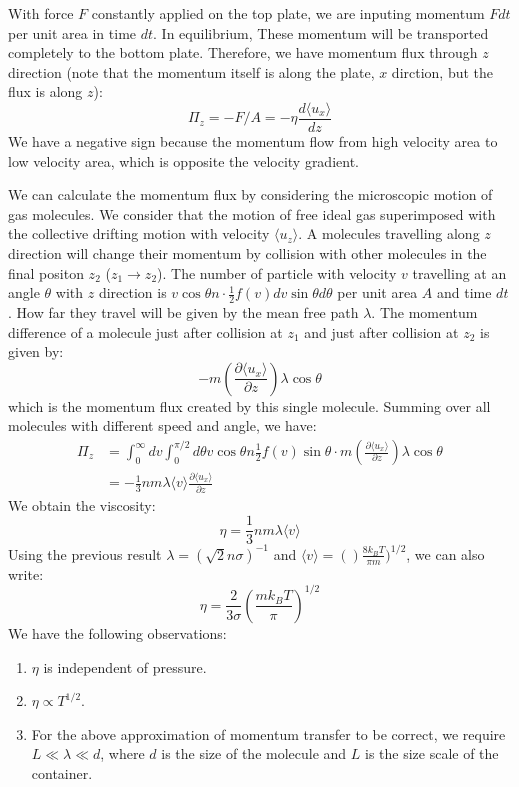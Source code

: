 \documentclass{article}
\begin{document}
With force $F$ constantly applied on the top plate, we are inputing momentum $Fdt$ per unit area in time $dt$. In equilibrium, 
These momentum will be transported completely to the bottom plate. Therefore, we have momentum flux through $z$ direction 
(note that the momentum itself is along the plate, $x$ dirction, but the flux is along $z$):
\begin{equation}
    \Pi_z = - F / A = - \eta \frac{d \langle u_x \rangle}{dz}
\end{equation}
We have a negative sign because the momentum flow from high velocity area to low velocity area, which is opposite the velocity gradient.

We can calculate the momentum flux by considering the microscopic motion of gas molecules. We consider that the motion of free ideal gas superimposed 
with the collective drifting motion with velocity $\langle u_z \rangle$. A molecules travelling along $z$ direction will
change their momentum by collision with other molecules in the final positon $z_2$ ($z_1 \to z_2$). The number of particle with velocity $v$ travelling
at an angle $\theta$ with $z$ direction is $ v\cos \theta n \cdot \frac{1}{2} f(v) dv \sin\theta d\theta $ per unit area $A$ and time $dt$. How far they 
travel will be given by the mean free path $\lambda$. The momentum difference of a molecule just after collision at $z_1$ and just after collision at $z_2$ is 
given by:
\begin{equation}
    - m \left( \frac{\partial \langle u_x \rangle}{\partial z} \right) \lambda \cos\theta
\end{equation}
which is the momentum flux created by this single molecule. Summing over all molecules with different speed and angle, we have:
\begin{align}
    \Pi_z &= \int_0^{\infty} dv \int_0^{\pi/2} d\theta 
     v \cos \theta n \frac{1}{2} f(v) \sin\theta \cdot m \left( \frac{\partial \langle u_x \rangle}{\partial z} \right) \lambda \cos\theta \\
     &= -\frac{1}{3} n m \lambda \langle v \rangle \frac{\partial \langle u_x \rangle}{\partial z} \label{momentum_transfer}
\end{align}
We obtain the viscosity:
\begin{equation}
    \eta = \frac{1}{3} n m \lambda \langle v \rangle
\end{equation}
Using the previous result $\lambda = (\sqrt{2}n\sigma)^{-1}$ and $\langle v \rangle = ()\frac{8k_BT}{\pi m})^{1/2}$, we can also write:
\begin{equation}
    \eta = \frac{2}{3\sigma}\left( \frac{mk_BT}{\pi} \right)^{1/2}
\end{equation}
We have the following observations:
\begin{enumerate}
    \item $\eta$ is independent of pressure.
    \item $\eta \propto T^{1/2}$.
    \item For the above approximation of momentum transfer to be correct, we require $ L \ll \lambda \ll d $, where $d$ is the size of the molecule and $L$ is the size scale of the container.
\end{enumerate}
\end{document}
